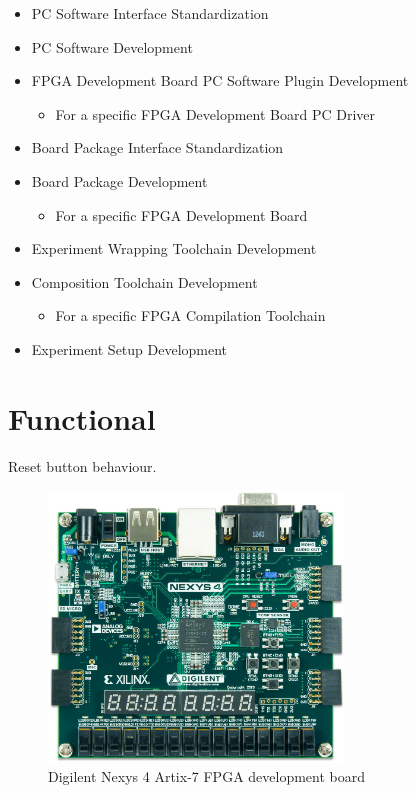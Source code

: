 \documentclass[openright]{template/uva-bachelor-thesis}
\begin{document}
\begin{itemize}
\item PC Software Interface Standardization
\item PC Software Development
\item FPGA Development Board PC Software Plugin Development
\begin{itemize}
\item For a specific FPGA Development Board PC Driver
\end{itemize}
\item Board Package Interface Standardization
\item Board Package Development
\begin{itemize}
\item For a specific FPGA Development Board
\end{itemize}
\item Experiment Wrapping Toolchain Development
\item Composition Toolchain Development
\begin{itemize}
\item For a specific FPGA Compilation Toolchain
\end{itemize}
\item Experiment Setup Development
\end{itemize}


\section{Functional}
Reset button behaviour.

\begin{figure}
\centering
\includegraphics[width=0.7\textwidth]{img/nexys4-small}
\caption{Digilent Nexys 4 Artix-7 FPGA development board}
\label{fig:nexys4}
\end{figure}
\end{document}
